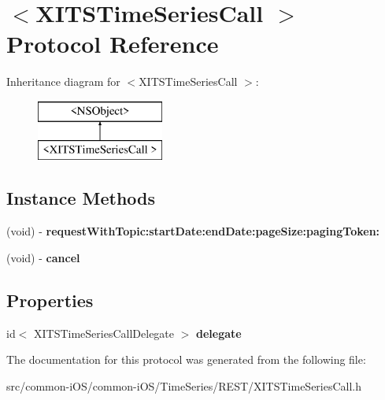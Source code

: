 \hypertarget{protocol_x_i_t_s_time_series_call_01-p}{}\section{$<$X\+I\+T\+S\+Time\+Series\+Call $>$ Protocol Reference}
\label{protocol_x_i_t_s_time_series_call_01-p}
Inheritance diagram for $<$X\+I\+T\+S\+Time\+Series\+Call $>$\+:\begin{figure}[H]
\begin{center}
\leavevmode
\includegraphics[height=2.000000cm]{protocol_x_i_t_s_time_series_call_01-p}
\end{center}
\end{figure}
\subsection*{Instance Methods}
\begin{DoxyCompactItemize}
\item 
\hypertarget{protocol_x_i_t_s_time_series_call_01-p_af88972a28768f76f82bbd798d14e2a6d}{}\label{protocol_x_i_t_s_time_series_call_01-p_af88972a28768f76f82bbd798d14e2a6d} 
(void) -\/ {\bfseries request\+With\+Topic\+:start\+Date\+:end\+Date\+:page\+Size\+:paging\+Token\+:}
\item 
\hypertarget{protocol_x_i_t_s_time_series_call_01-p_a68e09327f67fab94f4cee99f112c2f7e}{}\label{protocol_x_i_t_s_time_series_call_01-p_a68e09327f67fab94f4cee99f112c2f7e} 
(void) -\/ {\bfseries cancel}
\end{DoxyCompactItemize}
\subsection*{Properties}
\begin{DoxyCompactItemize}
\item 
\hypertarget{protocol_x_i_t_s_time_series_call_01-p_ab3ad41b6a250f806a333f99ada7f30d5}{}\label{protocol_x_i_t_s_time_series_call_01-p_ab3ad41b6a250f806a333f99ada7f30d5} 
id$<$ X\+I\+T\+S\+Time\+Series\+Call\+Delegate $>$ {\bfseries delegate}
\end{DoxyCompactItemize}


The documentation for this protocol was generated from the following file\+:\begin{DoxyCompactItemize}
\item 
src/common-\/i\+O\+S/common-\/i\+O\+S/\+Time\+Series/\+R\+E\+S\+T/X\+I\+T\+S\+Time\+Series\+Call.\+h\end{DoxyCompactItemize}
